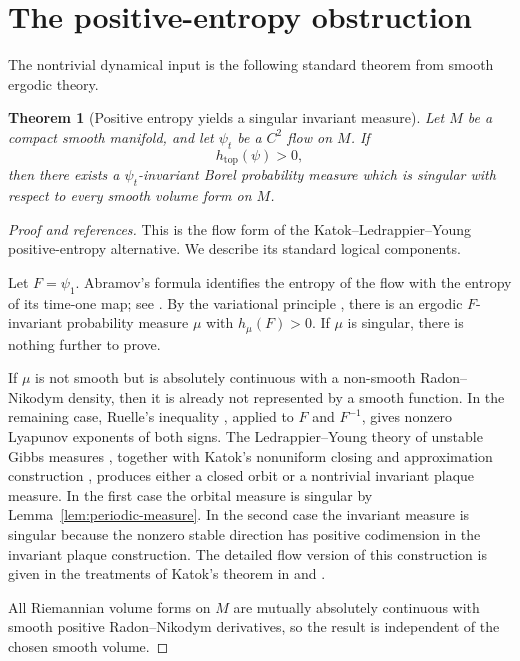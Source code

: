 \documentclass[11pt]{article}
\newtheorem{theorem}{Theorem}[section]
\theoremstyle{definition}
\theoremstyle{remark}
\newcommand{\htop}{h_{\mathrm{top}}}
\begin{document}
\section{The positive-entropy obstruction}

The nontrivial dynamical input is the following standard theorem from
smooth ergodic theory.

\begin{theorem}[Positive entropy yields a singular invariant measure]
\label{thm:singular-entropy}
Let \(M\) be a compact smooth manifold, and let \(\psi_t\) be a
\(C^2\) flow on \(M\).  If
\[
\htop(\psi)>0,
\]
then there exists a \(\psi_t\)-invariant Borel probability measure
which is singular with respect to every smooth volume form on \(M\).
\end{theorem}

\begin{proof}[Proof and references]
This is the flow form of the Katok--Ledrappier--Young positive-entropy
alternative.  We describe its standard logical components.

Let \(F=\psi_1\).  Abramov's formula identifies the entropy of the
flow with the entropy of its time-one map; see \cite[Chapter~9]{KH}.
By the variational principle \cite[Theorem~8.6]{Walters}, there is an
ergodic \(F\)-invariant probability measure \(\mu\) with
\(h_\mu(F)>0\).  If \(\mu\) is singular, there is nothing further to
prove.

If \(\mu\) is not smooth but is absolutely continuous with a
non-smooth Radon--Nikodym density, then it is already not represented
by a smooth function.  In the remaining case, Ruelle's inequality
\cite{Ruelle}, applied to \(F\) and \(F^{-1}\), gives nonzero
Lyapunov exponents of both signs.  The Ledrappier--Young theory of
unstable Gibbs measures \cite{LY1,LY2}, together with Katok's
nonuniform closing and approximation construction \cite{Katok},
produces either a closed orbit or a nontrivial invariant plaque
measure.  In the first case the orbital measure is singular by
Lemma~\ref{lem:periodic-measure}.  In the second case the invariant
measure is singular because the nonzero stable direction has
positive codimension in the invariant plaque construction.  The
detailed flow version of this construction is given in the treatments
of Katok's theorem in \cite[Supplement~S]{KH} and
\cite[Chapters~10 and~15]{BP}.

All Riemannian volume forms on \(M\) are mutually absolutely
continuous with smooth positive Radon--Nikodym derivatives, so the
result is independent of the chosen smooth volume.
\end{proof}
\end{document}
